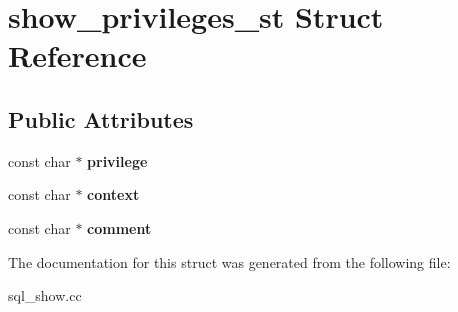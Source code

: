 \hypertarget{structshow__privileges__st}{}\section{show\+\_\+privileges\+\_\+st Struct Reference}
\label{structshow__privileges__st}
\subsection*{Public Attributes}
\begin{DoxyCompactItemize}
\item 
\mbox{\label{structshow__privileges__st_aaaf15da5647a707996e6a686c20feb81}} 
const char $\ast$ {\bfseries privilege}
\item 
\mbox{\label{structshow__privileges__st_a6e37a0de60269855fe657afc552b9b9a}} 
const char $\ast$ {\bfseries context}
\item 
\mbox{\label{structshow__privileges__st_ae15fa1834a555d41fdb112e158b7a649}} 
const char $\ast$ {\bfseries comment}
\end{DoxyCompactItemize}


The documentation for this struct was generated from the following file\+:\begin{DoxyCompactItemize}
\item 
sql\+\_\+show.\+cc\end{DoxyCompactItemize}
